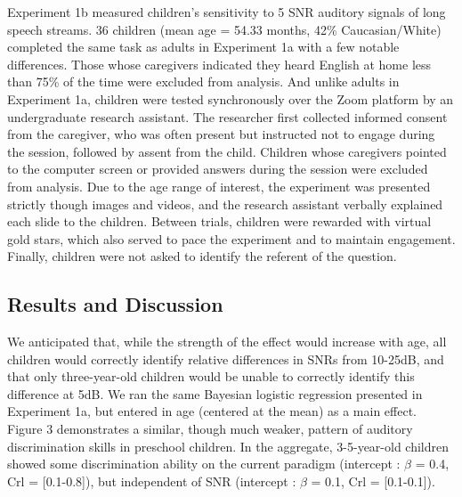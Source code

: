 \documentclass[10pt, letterpaper]{article}
\begin{document}
Experiment 1b measured children's sensitivity to 5 SNR auditory signals
of long speech streams. 36 children (mean age = 54.33 months, 42\%
Caucasian/White) completed the same task as adults in Experiment 1a with
a few notable differences. Those whose caregivers indicated they heard
English at home less than 75\% of the time were excluded from analysis.
And unlike adults in Experiment 1a, children were tested synchronously
over the Zoom platform by an undergraduate research assistant. The
researcher first collected informed consent from the caregiver, who was
often present but instructed not to engage during the session, followed
by assent from the child. Children whose caregivers pointed to the
computer screen or provided answers during the session were excluded
from analysis. Due to the age range of interest, the experiment was
presented strictly though images and videos, and the research assistant
verbally explained each slide to the children. Between trials, children
were rewarded with virtual gold stars, which also served to pace the
experiment and to maintain engagement. Finally, children were not asked
to identify the referent of the question.

\hypertarget{results-and-discussion-1}{%
\subsection{\texorpdfstring{\textbf{Results and
Discussion}}{Results and Discussion}}\label{results-and-discussion-1}}

We anticipated that, while the strength of the effect would increase
with age, all children would correctly identify relative differences in
SNRs from 10-25dB, and that only three-year-old children would be unable
to correctly identify this difference at 5dB. We ran the same Bayesian
logistic regression presented in Experiment 1a, but entered in age
(centered at the mean) as a main effect. Figure 3 demonstrates a
similar, though much weaker, pattern of auditory discrimination skills
in preschool children. In the aggregate, 3-5-year-old children showed
some discrimination ability on the current paradigm (intercept :
\(\beta\) = 0.4, Crl = {[}0.1-0.8{]}), but independent of SNR (intercept
: \(\beta\) = 0.1, Crl = {[}0.1-0.1{]}).
\end{document}
